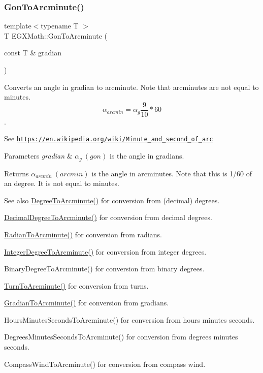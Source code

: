 \subsubsection{\texorpdfstring{Gon\+To\+Arcminute()}{GonToArcminute()}}
{\footnotesize\ttfamily template$<$typename T $>$ \\
T E\+G\+X\+Math\+::\+Gon\+To\+Arcminute (\begin{DoxyParamCaption}\item[{const T \&}]{gradian }\end{DoxyParamCaption})}



Converts an angle in gradian to arcminute. Note that arcminutes are not equal to minutes. \[\alpha_{arcmin}=\alpha_{g}\frac{9}{10} * 60\]. 

See \href{https://en.wikipedia.org/wiki/Minute_and_second_of_arc}{\tt https\+://en.\+wikipedia.\+org/wiki/\+Minute\+\_\+and\+\_\+second\+\_\+of\+\_\+arc} 
\begin{DoxyParams}{Parameters}
{\em gradian} & $\alpha_{g}\ (gon)$ is the angle in gradians. \\
\hline
\end{DoxyParams}
\begin{DoxyReturn}{Returns}
$\alpha_{arcmin}\ (arcmin)$ is the angle in arcminutes. Note that this is 1/60 of an degree. It is not equal to minutes. 
\end{DoxyReturn}
\begin{DoxySeeAlso}{See also}
\mbox{\hyperlink{group___e_g_x_math-_angle_conversions-_degree_ga8abf327dc5f52907b2c881999e9cc43e}{Degree\+To\+Arcminute()}} for conversion from (decimal) degrees. 

\mbox{\hyperlink{group___e_g_x_math-_angle_conversions-_decimal_degree_ga6b6ea6e45d2a13f556824ca419cc9fbd}{Decimal\+Degree\+To\+Arcminute()}} for conversion from decimal degrees. 

\mbox{\hyperlink{group___e_g_x_math-_angle_conversions-_radian_ga722e3b8e78540a6b3942b73b64aeb8d2}{Radian\+To\+Arcminute()}} for conversion from radians. 

\mbox{\hyperlink{group___e_g_x_math-_angle_conversions-_integer_degree_ga78b014e7649d666a3647c467e64e4fe8}{Integer\+Degree\+To\+Arcminute()}} for conversion from integer degrees. 

Binary\+Degree\+To\+Arcminute() for conversion from binary degrees. 

\mbox{\hyperlink{group___e_g_x_math-_angle_conversions-_turn_ga72cda928d9043c7d82097b1a7920769e}{Turn\+To\+Arcminute()}} for conversion from turns. 

\mbox{\hyperlink{group___e_g_x_math-_angle_conversions-_gradian_ga67ef7daad49b0d73c39c52d426ab46a5}{Gradian\+To\+Arcminute()}} for conversion from gradians. 

Hours\+Minutes\+Seconds\+To\+Arcminute() for conversion from hours minutes seconds. 

Degrees\+Minutes\+Seconds\+To\+Arcminute() for conversion from degrees minutes seconds. 

Compass\+Wind\+To\+Arcminute() for conversion from compass wind. 
\end{DoxySeeAlso}
